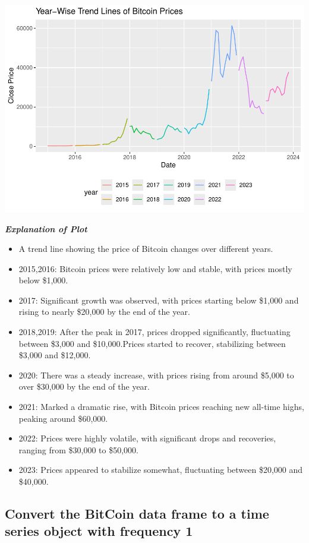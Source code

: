 \documentclass[
]{book}
\providecommand{\tightlist}{%
  \setlength{\itemsep}{0pt}\setlength{\parskip}{0pt}}
\begin{document}
\includegraphics{bookdown-demo_files/figure-latex/unnamed-chunk-11-1.pdf}

\emph{\textbf{Explanation of Plot}}

\begin{itemize}
\tightlist
\item
  A trend line showing the price of Bitcoin changes over different years.
\item
  2015,2016: Bitcoin prices were relatively low and stable, with prices mostly below \$1,000.
\item
  2017: Significant growth was observed, with prices starting below \$1,000 and rising to nearly \$20,000 by the end of the year.
\item
  2018,2019: After the peak in 2017, prices dropped significantly, fluctuating between \$3,000 and \$10,000.Prices started to recover, stabilizing between \$3,000 and \$12,000.
\item
  2020: There was a steady increase, with prices rising from around \$5,000 to over \$30,000 by the end of the year.
\item
  2021: Marked a dramatic rise, with Bitcoin prices reaching new all-time highs, peaking around \$60,000.
\item
  2022: Prices were highly volatile, with significant drops and recoveries, ranging from \$30,000 to \$50,000.
\item
  2023: Prices appeared to stabilize somewhat, fluctuating between \$20,000 and \$40,000.
\end{itemize}

\subsection*{Convert the BitCoin data frame to a time series object with frequency 1}\label{convert-the-bitcoin-data-frame-to-a-time-series-object-with-frequency-1}
\end{document}
